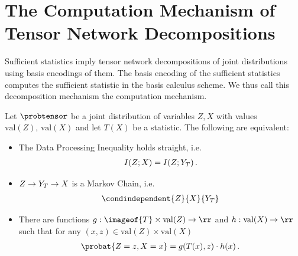 \documentclass[aps,onecolumn,nofootinbib,pra]{article}
\begin{document}
    \section{The Computation Mechanism of Tensor Network Decompositions}

    Sufficient statistics imply tensor network decompositions of joint distributions using basis encodings of them.
    The basis encoding of the sufficient statistics computes the sufficient statistic in the basis calculus scheme.
    We thus call this decomposition mechanism the computation mechanism.

    \begin{theorem}
        \label{the:factorizationFisherNeyman}
        Let $\probtensor$ be a joint distribution of variables $Z,X$ with values $\mathrm{val}(Z), \,\mathrm{val}(X)$ and let $T(X)$ be a statistic.
        The following are equivalent:
        \begin{itemize}
            \item[i)] The Data Processing Inequality holds straight, i.e.
            \begin{align*}
                I(Z;X) = I(Z;Y_{T}) \, .
            \end{align*}
            \item[ii)] $Z\rightarrow Y_{T}\rightarrow X$ is a Markov Chain, i.e.
            \begin{align*}
                \condindependent{Z}{X}{\headvariableof{T}}
            \end{align*}
            \item[iii)] There are functions $g : \imageof{T} \times \mathrm{val}(Z) \rightarrow \rr$ and $h: \mathrm{val}(X)\rightarrow\rr$ such that for any $(x,z)\in\mathrm{val}(Z)\times \mathrm{val}(X)$
            \begin{align*}
                \probat{Z=z,X=x} = g(T(x),z) \cdot h(x) \, .
            \end{align*}
        \end{itemize}
    \end{theorem}
\end{document}
